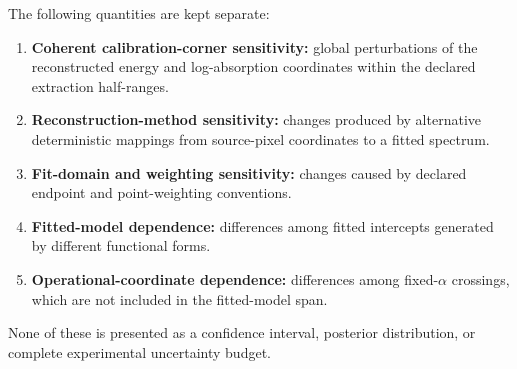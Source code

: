 The following quantities are kept separate:

\begin{enumerate}
\def\labelenumi{\arabic{enumi}.}
\tightlist
\item
  \textbf{Coherent calibration-corner sensitivity:} global perturbations
  of the reconstructed energy and log-absorption coordinates within the
  declared extraction half-ranges.
\item
  \textbf{Reconstruction-method sensitivity:} changes produced by
  alternative deterministic mappings from source-pixel coordinates to a
  fitted spectrum.
\item
  \textbf{Fit-domain and weighting sensitivity:} changes caused by
  declared endpoint and point-weighting conventions.
\item
  \textbf{Fitted-model dependence:} differences among fitted intercepts
  generated by different functional forms.
\item
  \textbf{Operational-coordinate dependence:} differences among
  fixed-\(\alpha\) crossings, which are not included in the fitted-model
  span.
\end{enumerate}

None of these is presented as a confidence interval, posterior
distribution, or complete experimental uncertainty budget.
